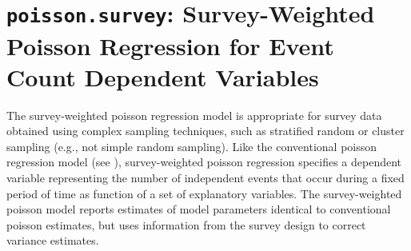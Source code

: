 \section{{\tt poisson.survey}: Survey-Weighted Poisson Regression for Event Count Dependent Variables}
\label{poisson.survey}

The survey-weighted poisson regression model is appropriate for 
survey data obtained using complex sampling techniques, such as 
stratified random or cluster sampling (e.g., not simple random 
sampling).  Like the conventional poisson regression model (see 
), survey-weighted poisson regression specifies a 
dependent variable representing the number of independent events 
that occur during a fixed period of time as function of a set of 
explanatory variables.  The survey-weighted poisson model reports 
estimates of model parameters identical to conventional poisson 
estimates, but uses information from the survey design to correct 
variance estimates.

